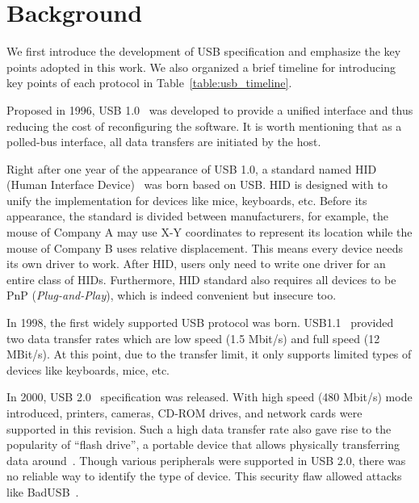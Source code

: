 \section{Background}
\label{sec:background}

We first introduce the development of USB specification and emphasize the key
points adopted in this work. We also organized a brief timeline for introducing
key points of each protocol in Table~\ref{table:usb_timeline}.

Proposed in 1996, USB 1.0~\cite{usb10} was developed to provide a unified
interface and thus reducing the cost of reconfiguring the software. It is
worth mentioning that as a polled-bus interface, all data transfers are
initiated by the host.

Right after one year of the appearance of USB 1.0, a standard named HID (Human
Interface Device)~\cite{hid} was born based on USB. HID is
designed with to unify the implementation for devices like mice,
keyboards, etc. Before its appearance, the standard is divided between
manufacturers, for example, the mouse of Company A may use X-Y coordinates to
represent its location while the mouse of Company B uses relative displacement.
This means every device needs its own driver to work. After HID, users only need to
write one driver for an entire class of HIDs. Furthermore, HID standard also
requires all devices to be PnP (\emph{Plug-and-Play}), which is indeed
convenient but insecure too.

In 1998, the first widely supported USB protocol was born. USB1.1~\cite{usb11}
provided two data transfer rates which are low speed (1.5 Mbit/s) and full
speed (12 MBit/s). At this point, due to the transfer limit, it only supports
limited types of devices like keyboards, mice, etc.

In 2000, USB 2.0~\cite{usb20} specification was released. With high speed (480
Mbit/s) mode introduced, printers, cameras, CD-ROM drives, and network cards were
supported in this revision. Such a high data transfer rate also gave rise to the
popularity of ``flash drive'', a portable device that allows physically
transferring data around~\cite{sok}. Though various peripherals were supported
in USB 2.0, there was no reliable way to identify the type of device. This
security flaw allowed attacks like BadUSB~\cite{badusb,rubber}.

